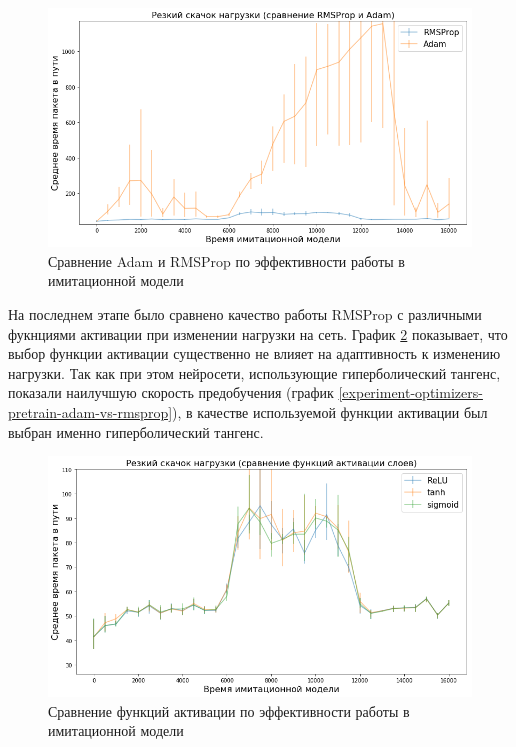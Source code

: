 \documentclass[specification, annotation]{itmo-student-thesis}
\begin{document}
\begin{figure}[!h]
  \caption{Сравнение Adam и RMSProp по эффективности работы в
    имитационной модели}\label{experiment-adam-failure}
  \centering
  \includegraphics[scale=0.6]{experiment-adam-failure}
\end{figure}

На последнем этапе было сравнено качество работы RMSProp с различными фукнциями
активации при изменении нагрузки на сеть. График
\ref{experiment-activations-launch} показывает, что выбор функции активации
существенно не влияет на адаптивность к изменению нагрузки. Так как при этом
нейросети, использующие гиперболический тангенс, показали наилучшую скорость
предобучения (график \ref{experiment-optimizers-pretrain-adam-vs-rmsprop}), в
качестве используемой функции активации был выбран именно гиперболический
тангенс.

\begin{figure}[!h]
  \caption{Сравнение функций активации по эффективности работы в
    имитационной модели}\label{experiment-activations-launch}
  \centering
  \includegraphics[scale=0.6]{experiment-activations-launch}
\end{figure}
\end{document}
